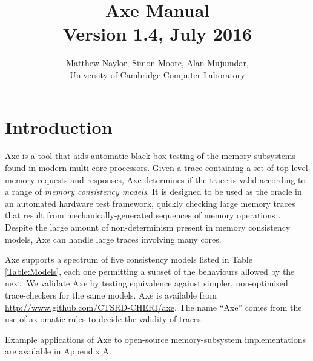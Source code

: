 \documentclass[11pt]{article}
\begin{document}
\title{{\bf Axe Manual}\\
{\large Version 1.4, July 2016}}
\author{Matthew Naylor, Simon Moore, Alan Mujumdar, \\
University of Cambridge Computer Laboratory}
\date{}
\maketitle

\tableofcontents

\newpage

\setlength{\parskip}{1em}
\renewcommand{\thefootnote}{\fnsymbol{footnote}}

\newcommand{\cmark}{\ding{51}}
\newcommand{\xmark}{\ding{55}}

\section{Introduction}

Axe is a tool that aids automatic black-box testing of the
memory subsystems found in modern multi-core processors.  Given a
trace containing a set of top-level memory requests and responses, Axe
determines if the trace is valid according to a range of \emph{memory
consistency models}.  It is designed to be used as the oracle in an
automated hardware test framework, quickly checking large memory
traces that result from mechanically-generated sequences of memory
operations \cite{BlueCheck}.
Despite
the large amount of non-determinism present in memory consistency
models, Axe can handle large traces involving many cores.

Axe supports a spectrum of five consistency models listed in Table
\ref{Table:Models}, each one permitting a subset of the behaviours
allowed by the next.
We validate Axe by testing equivalence against simpler, non-optimised
trace-checkers for the same models.
Axe is available from \url{http://www.github.com/CTSRD-CHERI/axe}.
The name ``Axe'' comes from the use of axiomatic rules to decide the
validity of traces.

Example applications of Axe to open-source memory-subsystem
implementations are available in Appendix A.
\end{document}
